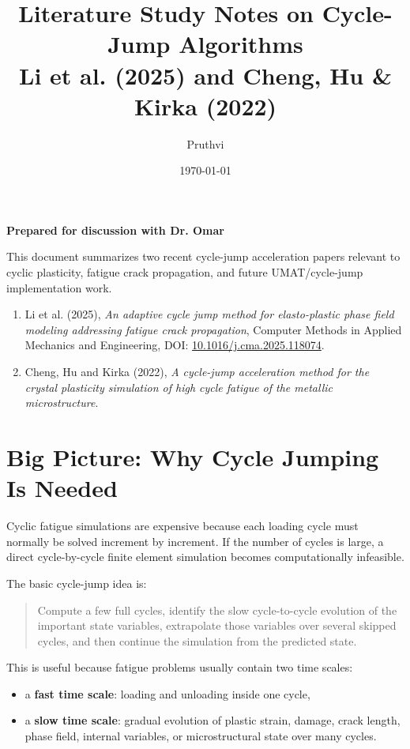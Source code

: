 \documentclass[11pt,a4paper]{article}
\title{\textbf{Literature Study Notes on Cycle-Jump Algorithms}\\
\large Li et al. (2025) and Cheng, Hu \& Kirka (2022)}
\author{Pruthvi}
\date{\today}
\begin{document}
\maketitle

\begin{center}
\textbf{Prepared for discussion with Dr. Omar}
\end{center}

\vspace{0.5cm}

\noindent
This document summarizes two recent cycle-jump acceleration papers relevant to cyclic plasticity, fatigue crack propagation, and future UMAT/cycle-jump implementation work.

\begin{enumerate}
    \item Li et al. (2025), \textit{An adaptive cycle jump method for elasto-plastic phase field modeling addressing fatigue crack propagation}, Computer Methods in Applied Mechanics and Engineering, DOI: \href{https://doi.org/10.1016/j.cma.2025.118074}{10.1016/j.cma.2025.118074}.
    \item Cheng, Hu and Kirka (2022), \textit{A cycle-jump acceleration method for the crystal plasticity simulation of high cycle fatigue of the metallic microstructure}.
\end{enumerate}

\section{Big Picture: Why Cycle Jumping Is Needed}

Cyclic fatigue simulations are expensive because each loading cycle must normally be solved increment by increment. If the number of cycles is large, a direct cycle-by-cycle finite element simulation becomes computationally infeasible.

The basic cycle-jump idea is:

\begin{quote}
Compute a few full cycles, identify the slow cycle-to-cycle evolution of the important state variables, extrapolate those variables over several skipped cycles, and then continue the simulation from the predicted state.
\end{quote}

This is useful because fatigue problems usually contain two time scales:

\begin{itemize}
    \item a \textbf{fast time scale}: loading and unloading inside one cycle,
    \item a \textbf{slow time scale}: gradual evolution of plastic strain, damage, crack length, phase field, internal variables, or microstructural state over many cycles.
\end{itemize}
\end{document}
